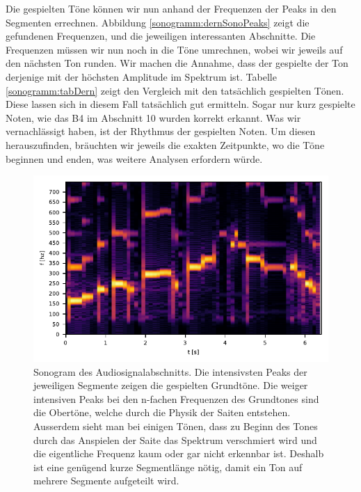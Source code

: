 Die gespielten Töne können wir nun anhand der Frequenzen 
der Peaks in den Segmenten errechnen.
Abbildung \ref{sonogramm:dernSonoPeaks} zeigt die gefundenen Frequenzen, und die
jeweiligen interessanten Abschnitte.
Die Frequenzen müssen wir nun noch in die Töne umrechnen, wobei wir jeweils auf den
nächsten Ton runden.
Wir machen die Annahme, dass der gespielte der Ton derjenige mit der höchsten Amplitude im Spektrum 
ist. 
Tabelle \ref{sonogramm:tabDern} zeigt den Vergleich mit den tatsächlich gespielten Tönen.
Diese lassen sich in diesem Fall tatsächlich gut ermitteln.
Sogar nur kurz gespielte Noten, wie das B4 im Abschnitt 10 
wurden korrekt erkannt.
Was wir vernachlässigt haben, ist der Rhythmus der gespielten Noten.
Um diesen herauszufinden, bräuchten wir jeweils die exakten Zeitpunkte, wo die Töne
beginnen und enden, was weitere Analysen erfordern würde.

\begin{figure}
    \centering
    \includegraphics{papers/sonogramm/images/dernSono1.pdf}
    \caption{Sonogram des Audiosignalabschnitts. Die intensivsten Peaks der 
    jeweiligen Segmente zeigen die gespielten Grundtöne. Die weiger
    intensiven Peaks bei den n-fachen Frequenzen des Grundtones sind die Obertöne, welche durch die Physik der Saiten 
    entstehen.
    Ausserdem sieht man bei einigen Tönen, dass zu Beginn des Tones durch das Anspielen der Saite das Spektrum verschmiert wird
    und die eigentliche Frequenz kaum oder gar nicht erkennbar ist.
    Deshalb ist eine genügend kurze Segmentlänge nötig, damit ein Ton auf mehrere Segmente aufgeteilt wird.
    \label{sonogramm:dernSono}
    }
\end{figure}

